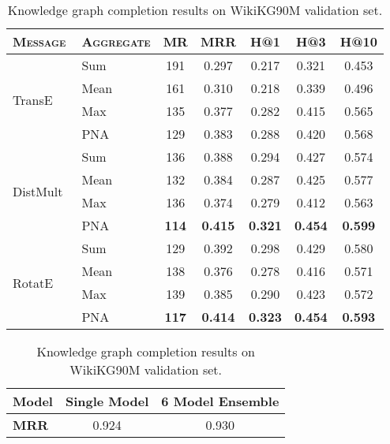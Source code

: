 \begin{table}[!h]
    \begin{minipage}{0.58\textwidth}
    \centering
    \caption{Results of different \textsc{Message} and \textsc{Aggregate} functions on FB15k-237.}
    \begin{adjustbox}{max width=\textwidth}
    \begin{tabular}{llccccc}
        \toprule
        \bf{\textsc{Message}} & \bf{\textsc{Aggregate}} & \bf{MR} & \bf{MRR} & \bf{H@1} & \bf{H@3} & \bf{H@10} \\
        \midrule
        \multirow{4}{*}{TransE~\cite{bordes2013translating}}
        & Sum & 191 & 0.297 & 0.217 & 0.321 & 0.453 \\
        & Mean & 161 & 0.310 & 0.218 & 0.339 & 0.496 \\
        & Max & 135 & 0.377 & 0.282 & 0.415 & 0.565 \\
        & PNA~\cite{corso2020principal} & 129 & 0.383 & 0.288 & 0.420 & 0.568 \\
        \midrule
        \multirow{4}{*}{DistMult~\cite{yang2015embedding}}
        & Sum & 136 & 0.388 & 0.294 & 0.427 & 0.574 \\
        & Mean & 132 & 0.384 & 0.287 & 0.425 & 0.577 \\
        & Max & 136 & 0.374 & 0.279 & 0.412 & 0.563 \\
        & PNA~\cite{corso2020principal} & \bf{114} & \bf{0.415} & \bf{0.321} & \bf{0.454} & \bf{0.599} \\
        \midrule
        \multirow{4}{*}{RotatE~\cite{sun2019rotate}}
        & Sum & 129 & 0.392 & 0.298 & 0.429 & 0.580 \\
        & Mean & 138 & 0.376 & 0.278 & 0.416 & 0.571 \\
        & Max & 139 & 0.385 & 0.290 & 0.423 & 0.572 \\
        & PNA~\cite{corso2020principal} & \bf{117} & \bf{0.414} & \bf{0.323} & \bf{0.454} & \bf{0.593} \\
        \bottomrule
    \end{tabular}
    \end{adjustbox}
    \label{tab:msg_agg_full}
    \end{minipage}
    \hspace{0.3em}
    \begin{minipage}{0.42\textwidth}
    \centering
    \caption{Knowledge graph completion results on WikiKG90M validation set.}
    \label{tab:ogb_lsc}
    \begin{adjustbox}{max width=\textwidth}
        \begin{tabular}{lcc}
            \toprule
            \bf{Model} & Single Model & 6 Model Ensemble \\
            \midrule
            \bf{MRR} & 0.924 & 0.930 \\
            \bottomrule
        \end{tabular}
    \end{adjustbox}
    \vspace{1.5em}
    

\end{minipage}
\end{table}
